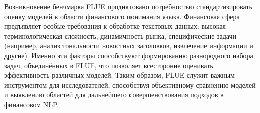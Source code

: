 Возникновение бенчмарка FLUE продиктовано потребностью стандартизировать оценку моделей в области финансового понимания языка.
Финансовая сфера предъявляет особые требования к обработке текстовых данных: высокая терминологическая сложность, динамичность
рынка, специфические задачи (например, анализ тональности новостных заголовков, извлечение информации и другие). Именно эти факторы
способствуют формированию разнородного набора задач, объединённых в FLUE, что позволяет всесторонне оценивать эффективность различных
моделей. Таким образом, FLUE служит важным инструментом для исследователей, способствуя объективному сравнению моделей и выявлению
областей для дальнейшего совершенствования подходов в финансовом NLP.